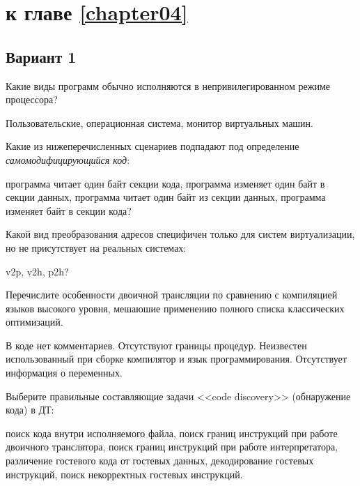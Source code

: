 \section{\Questions к главе \ref{chapter04}} %

\subsection*{Вариант 1}

\begin{questions}

\question[3] Какие виды программ обычно исполняются в непривилегированном режиме процессора?
\begin{choices}
    \correctchoice Пользовательские,
    \choice операционная система,
    \choice монитор виртуальных машин.
\end{choices}

\question[3] Какие из нижеперечисленных сценариев подпадают под определение \emph{самомодифицирующийся код}:
\begin{choices}
    \choice программа читает один байт  секции кода,
    \choice программа изменяет один байт в секции данных,
    \choice программа читает один байт из секции данных,
    \correctchoice программа изменяет байт в секции кода?
\end{choices}

\question[3] Какой вид преобразования адресов специфичен только для систем виртуализации, но не присутствует на реальных системах:
\begin{choices}
    \choice v2p,
    \correctchoice v2h,
    \choice p2h?
\end{choices}

\question[3] Перечислите особенности двоичной трансляции по сравнению с компиляцией языков высокого уровня, мешаюшие применению полного списка классических оптимизаций.
\begin{choices}
    \choice В коде нет комментариев.
    \correctchoice Отсутствуют границы процедур.
    \choice Неизвестен использованный при сборке компилятор и язык программирования.
    \correctchoice Отсутствует информация о переменных.
\end{choices}

\question[3] Выберите правильные составляющие задачи <<code discovery>> (обнаружение кода) в ДТ:
\begin{choices}
    \choice поиск кода внутри исполняемого файла,
    \correctchoice поиск границ инструкций при работе двоичного транслятора,
    \choice     поиск границ инструкций при работе интерпретатора,
    \correctchoice различение гостевого кода от гостевых данных,
    \choice     декодирование гостевых инструкций,
    \choice поиск некорректных гостевых инструкций.
\end{choices}


\end{questions}
